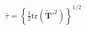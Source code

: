 \documentclass[preview]{standalone}
\begin{document}
\begin{align*}
\bar{\tau} = \left\{ \tfrac{1}{2} \mathrm{tr}(\tilde{\mathbf{T}}'^2) \right\}^{1/2}
\end{align*}
\end{document}
